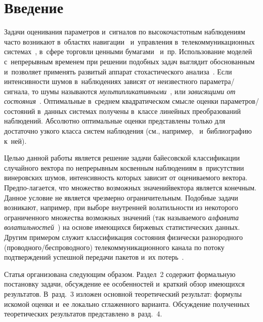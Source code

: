 \begin{multicols}{2}

\label{st\stat}

  \section{Введение}

  Задачи оценивания параметров и~сигналов по высокочастотным наблюдениям часто 
  возникают в~областях навигации~\cite{BLK_01} и~управления в~телекоммуникационных 
  системах~\cite{LBS_08}, в~сфере торговли ценными бумагами~\cite{ASJJ_14} и~пр.
Использование моделей с~непрерывным временем при решении подобных задач выглядит 
обоснованным и~позволяет применять развитый аппарат стохастического 
анализа~\cite{W_02, EMT_03}.
Если интенсивности шумов в~наблюдениях зависят от неизвестного па\-ра\-мет\-ра/сиг\-на\-ла, 
то шумы называются \textit{мультипликативными}~\cite{RSS_71}, 
или \textit{зависящими от состояния}~\cite{McL_69}. Оптимальные в~среднем 
квадратическом смысле оценки па\-ра\-мет\-ров/со\-сто\-яний в~данных системах 
получены в~классе линейных преобразований наблюдений. Абсолютно оптимальные 
оценки представлены только для достаточно узкого класса систем наблюдения 
(см., например,~\cite{CKX_09} и~библиографию к~ней).

Целью данной работы является решение задачи байесовской классификации 
случайного вектора по непрерывным косвенным наблюдениям в~присутствии 
винеровских шумов, интенсивность которых зависит от оцениваемого вектора.
Предпо-\linebreak лагается, что множество возможных значений\linebreak вектора является конечным. 
Данное условие не является чрезмерно ограничительным. Подобные задачи \mbox{возникают}, 
например, при выборе внутренней волатильности из некоторого ограниченного множества 
возможных значений (так называемого
\textit{алфавита волатильностей}~\cite{CRZ_06}) на основе имеющихся биржевых 
статистических данных. Другим примером служит классификация состояния физически 
разнородного (про\-вод\-но\-го/бес\-про\-вод\-но\-го) 
телекоммуникационного канала по потоку подтверждений успешной передачи пакетов и~их 
потерь~\cite{PVMP_15}.

Статья организована следующим образом. Раздел~2 содержит формальную постановку 
задачи, обсуждение ее особенностей и~краткий обзор имеющихся результатов. В~разд.~3 
изложен основной теоретический результат: формулы искомой оценки и~ее локально 
сглаженного варианта. Обсуждение полученных теоретических результатов представлено 
в~разд.~4.


\end{multicols}
